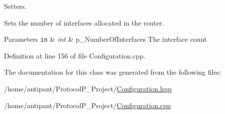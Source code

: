 Setters. 

Sets the number of interfaces allocated in the router.


\begin{DoxyParams}[1]{Parameters}
\mbox{\tt in}  & {\em int} & p\-\_\-\-Number\-Of\-Interfaces The interface count \\
\hline
\end{DoxyParams}


Definition at line 156 of file Configuration.\-cpp.



The documentation for this class was generated from the following files\-:\begin{DoxyCompactItemize}
\item 
/home/antipant/\-Protocol\-P\-\_\-\-Project/\hyperlink{Configuration_8hpp}{Configuration.\-hpp}\item 
/home/antipant/\-Protocol\-P\-\_\-\-Project/\hyperlink{Configuration_8cpp}{Configuration.\-cpp}\end{DoxyCompactItemize}
